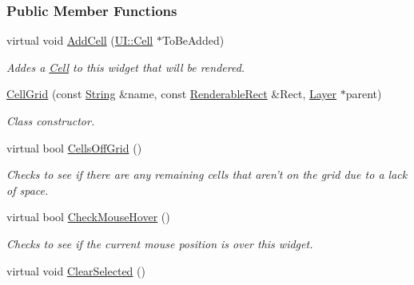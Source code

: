 \subsubsection*{Public Member Functions}
\begin{DoxyCompactItemize}
\item 
virtual void \hyperlink{classphys_1_1UI_1_1CellGrid_ac4f29519b3e2bca1fa146b2a9a20ec61}{AddCell} (\hyperlink{classphys_1_1UI_1_1Cell}{UI::Cell} $\ast$ToBeAdded)
\begin{DoxyCompactList}\small\item\em Addes a \hyperlink{classphys_1_1UI_1_1Cell}{Cell} to this widget that will be rendered. \item\end{DoxyCompactList}\item 
\hyperlink{classphys_1_1UI_1_1CellGrid_adabf84eb8411de0bcf9b57f648ca5810}{CellGrid} (const \hyperlink{namespacephys_aa03900411993de7fbfec4789bc1d392e}{String} \&name, const \hyperlink{structphys_1_1UI_1_1RenderableRect}{RenderableRect} \&Rect, \hyperlink{classphys_1_1UI_1_1Layer}{Layer} $\ast$parent)
\begin{DoxyCompactList}\small\item\em Class constructor. \item\end{DoxyCompactList}\item 
virtual bool \hyperlink{classphys_1_1UI_1_1CellGrid_ae901b18d90b8ed0d16da25ccfa91e84e}{CellsOffGrid} ()
\begin{DoxyCompactList}\small\item\em Checks to see if there are any remaining cells that aren't on the grid due to a lack of space. \item\end{DoxyCompactList}\item 
virtual bool \hyperlink{classphys_1_1UI_1_1CellGrid_a9c5f899c7db6c24d9aa2b03e59e5f0f0}{CheckMouseHover} ()
\begin{DoxyCompactList}\small\item\em Checks to see if the current mouse position is over this widget. \item\end{DoxyCompactList}\item 
\hypertarget{classphys_1_1UI_1_1CellGrid_ae2ad049f3e426c8a26cca6c59fb853aa}{
virtual void \hyperlink{classphys_1_1UI_1_1CellGrid_ae2ad049f3e426c8a26cca6c59fb853aa}{ClearSelected} ()}
\label{classphys_1_1UI_1_1CellGrid_ae2ad049f3e426c8a26cca6c59fb853aa}


\end{DoxyCompactItemize}
